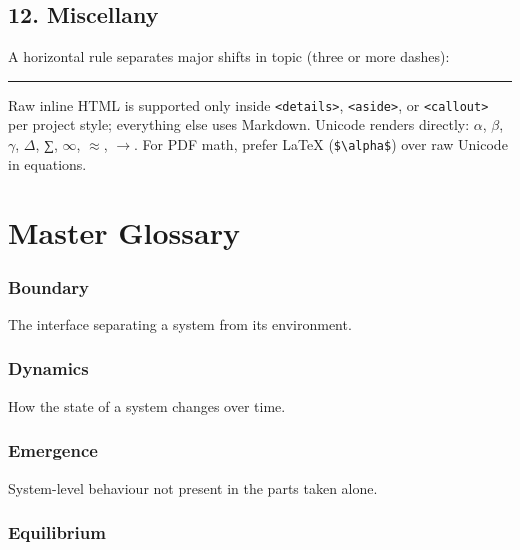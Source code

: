 \documentclass[
]{article}
\theoremstyle{plain}
\theoremstyle{definition}
\begin{document}
\subsection{12. Miscellany}\label{miscellany}

A horizontal rule separates major shifts in topic (three or more
dashes):

\begin{center}\rule{0.5\linewidth}{0.5pt}\end{center}

Raw inline HTML is supported only inside
\texttt{\textless{}details\textgreater{}},
\texttt{\textless{}aside\textgreater{}}, or
\texttt{\textless{}callout\textgreater{}} per project style; everything
else uses Markdown. Unicode renders directly: \texorpdfstring{\ensuremath{\alpha}}{alpha}, \texorpdfstring{\ensuremath{\beta}}{beta}, \texorpdfstring{\ensuremath{\gamma}}{gamma}, \texorpdfstring{\ensuremath{\Delta}}{Delta}, ∑, \texorpdfstring{\ensuremath{\infty}}{inf}, \texorpdfstring{\ensuremath{\approx}}{~}, \texorpdfstring{\ensuremath{\to}}{->}.
For PDF math, prefer LaTeX (\texttt{\$\textbackslash{}alpha\$}) over raw
Unicode in equations.

\newpage

\section{Master Glossary}\label{master-glossary}

\subsubsection{Boundary}\label{gl:boundary}

The interface separating a system from its environment.

\subsubsection{Dynamics}\label{gl:dynamics}

How the state of a system changes over time.

\subsubsection{Emergence}\label{gl:emergence}

System-level behaviour not present in the parts taken alone.

\subsubsection{Equilibrium}\label{gl:equilibrium}
\end{document}
